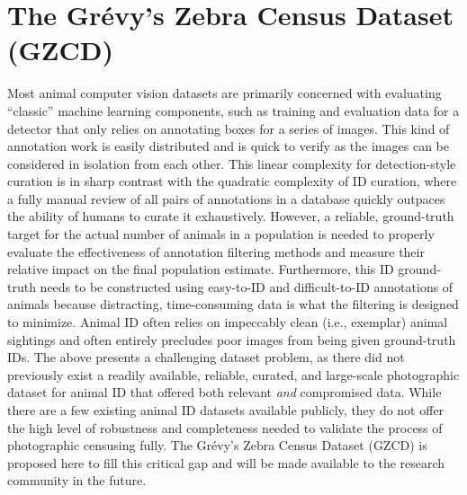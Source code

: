 \section{The Gr\'evy's Zebra Census Dataset (GZCD)} \label{sec:gzcd}

Most animal computer vision datasets are primarily concerned with evaluating ``classic'' machine learning components, such as training and evaluation data for a detector that only relies on annotating boxes for a series of images.  This kind of annotation work is easily distributed and is quick to verify as the images can be considered in isolation from each other.  This linear complexity for detection-style curation is in sharp contrast with the quadratic complexity of ID curation, where a fully manual review of all pairs of annotations in a database quickly outpaces the ability of humans to curate it exhaustively. However, a reliable, ground-truth target for the actual number of animals in a population is needed to properly evaluate the effectiveness of annotation filtering methods and measure their relative impact on the final population estimate. Furthermore, this ID ground-truth needs to be constructed using easy-to-ID and difficult-to-ID annotations of animals because distracting, time-consuming data is what the filtering is designed to minimize. Animal ID often relies on impeccably clean (i.e., exemplar) animal sightings and often entirely precludes poor images from being given ground-truth IDs. The above presents a challenging dataset problem, as there did not previously exist a readily available, reliable, curated, and large-scale photographic dataset for animal ID that offered both relevant \textit{and} compromised data.  While there are a few existing animal ID datasets available publicly, they do not offer the high level of robustness and completeness needed to validate the process of photographic censusing fully.  The Gr\'evy's Zebra Census Dataset (GZCD) is proposed here to fill this critical gap and will be made available to the research community in the future.

